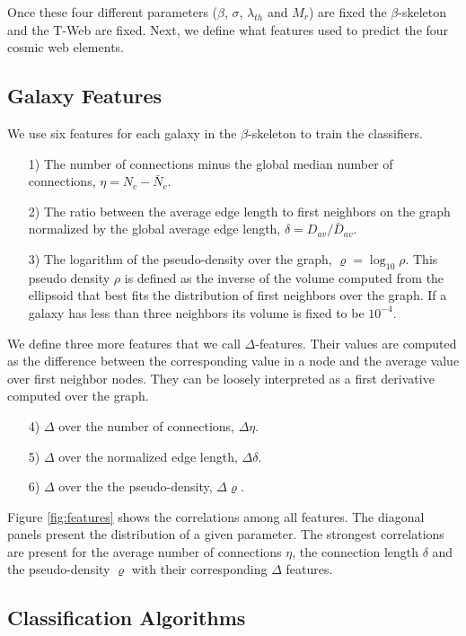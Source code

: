 \documentclass[usenatbib]{mnras}
\begin{document}
Once these four different parameters ($\beta$,
$\sigma$, $\lambda_{th}$ and $M_{r}$) are fixed the $\beta$-skeleton and the
T-Web are fixed.  
Next, we define what features used to predict the four cosmic web elements.

\subsection{Galaxy Features}
We use six features for each galaxy in the $\beta$-skeleton to train the classifiers. 

\begin{enumerate}
\item[1)]
The number of connections minus the global median number of
connections, $\eta = N_c - \bar{N}_c$. 
\item[2)]
The ratio between the average edge length to first neighbors on the graph
normalized by the global average edge length, $\delta=D_{av}/\bar{D}_{av}$. 
\item[3)] 
The logarithm of the pseudo-density over the graph,
  $\varrho=\log_{10}\rho$.   
This pseudo density $\rho$ is defined as the inverse of the volume
computed from the ellipsoid that best fits the distribution of first
neighbors over the graph. 
If a galaxy has less than three neighbors its volume is fixed to be $10^{-4}$.
\end{enumerate}
\noindent
We define three more features that we call $\Delta$-features.
Their values are computed as the difference between the corresponding
value in a node and the average value over first neighbor nodes.  
They can be loosely interpreted as a first derivative computed over the graph. 

\begin{enumerate}
\item[4)] $\Delta$ over the number of connections, $\Delta\eta$.
\item[5)] $\Delta$ over the normalized edge length, $\Delta\delta$.
\item[6)] $\Delta$ over the the pseudo-density, $\Delta\varrho$.
\end{enumerate}

Figure \ref{fig:features} shows the correlations among all features.
The diagonal panels present the distribution of a given parameter.
The strongest correlations are present for the average number of
connections $\eta$, the connection length $\delta$ and the
pseudo-density $\varrho$ with their
corresponding $\Delta$ features.


\subsection{Classification Algorithms}
\end{document}
